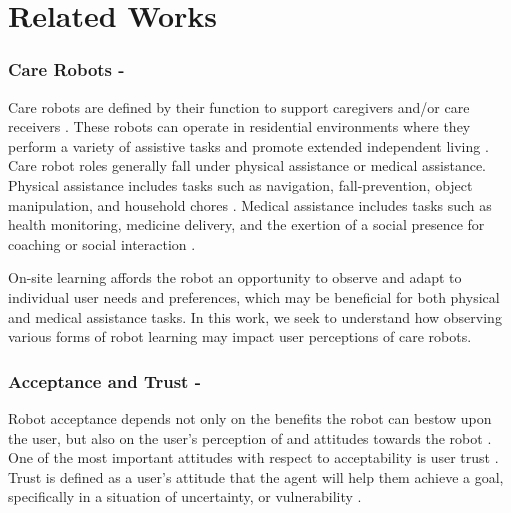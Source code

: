 \documentclass[letterpaper]{article} %
\begin{document}
\section{Related Works}
\label{sec:relatedworks}

\subsubsection{Care Robots -}
Care robots are defined by their function to support caregivers and/or care receivers \cite{van_wynsberghe_designing_2013}. These robots can operate in residential environments where they perform a variety of assistive tasks and promote extended independent living \cite{johnson_socially_2014,sabanovic_robot_2015, fiorini_assistive_2021, lee_reframing_2018}. Care robot roles generally fall under physical assistance or medical assistance. Physical assistance includes tasks such as navigation, fall-prevention, object manipulation, and household chores \cite{moxi, fischinger_hobbit_2016, swisslog_healthcare_autonomous_nodate, kittmann_let_2015, kostavelis_ramcip_2016, miseikis_lio-personal_2020}. Medical assistance includes tasks such as health monitoring, medicine delivery, and the exertion of a social presence for coaching or social interaction \cite{vitanza_assistive_2019, coradeschi_giraffplus_2013, umbrico_holistic_2020, nao, pepper, martinez-martin_pharos_2019}.

On-site learning affords the robot an opportunity to observe and adapt to individual user needs and preferences, which may be beneficial for both physical and medical assistance tasks. In this work, we seek to understand how observing various forms of robot learning may impact user perceptions of care robots. 

\subsubsection{Acceptance and Trust -}
Robot acceptance depends not only on the benefits the robot can bestow upon the user, but also on the user's perception of and attitudes towards the robot \cite{cesta_psychological_2007}. One of the most important attitudes with respect to acceptability is user trust \cite{yagoda_you_2012, langer_trust_2019}. Trust is defined as a user’s attitude that the agent will help them achieve a goal, specifically in a situation of uncertainty, or vulnerability \cite{kohn_measurement_2021, ullman_what_2018}. 
\end{document}

